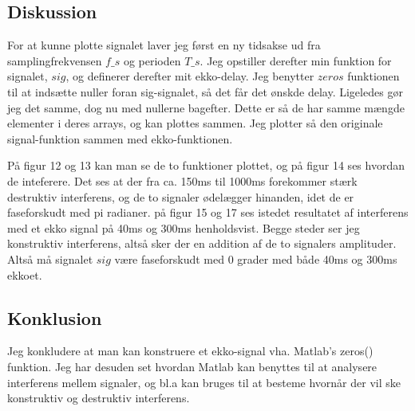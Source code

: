 \documentclass[../main.tex]{subfiles}
\begin{document}
\subsection{Diskussion}

For at kunne plotte signalet laver jeg først en ny tidsakse ud fra samplingfrekvensen $f\_s$ og perioden $T\_s$. Jeg opstiller derefter min funktion for signalet, $sig$, og definerer derefter mit ekko-delay. Jeg benytter $zeros$ funktionen til at indsætte nuller foran sig-signalet, så det får det ønskde delay. Ligeledes gør jeg det samme, dog nu med nullerne bagefter. Dette er så de har samme mængde elementer i deres arrays, og kan plottes sammen. Jeg plotter så den originale signal-funktion sammen med ekko-funktionen.

På figur 12 og 13 kan man se de to funktioner plottet, og på figur 14 ses hvordan de inteferere. Det ses at der fra ca. 150ms til 1000ms forekommer stærk destruktiv interferens, og de to signaler ødelægger hinanden, idet de er faseforskudt med pi radianer. på figur 15 og 17 ses istedet resultatet af interferens med et ekko signal på 40ms og 300ms henholdsvist. Begge steder ser jeg konstruktiv interferens, altså sker der en addition af de to signalers amplituder. Altså må signalet $sig$ være faseforskudt med 0 grader med både 40ms og 300ms ekkoet.

\subsection{Konklusion}
Jeg konkludere at man kan konstruere et ekko-signal vha. Matlab's zeros() funktion. Jeg har desuden set hvordan Matlab kan benyttes til at analysere interferens mellem signaler, og bl.a kan bruges til at besteme hvornår der vil ske konstruktiv og destruktiv interferens.
\end{document}
